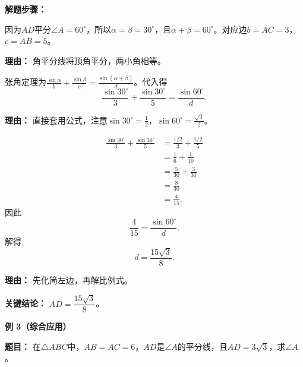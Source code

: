 \begin{examplebox}
	\textbf{\textcolor{CExample}{解题步骤：}}
	\begin{description}[style=nextline, leftmargin=2.8em, labelsep=0.5em, itemsep=0.45em]
		\item[\textbf{第一步(确定角度条件):}] 因为$AD$平分$\angle A=60^\circ$，所以$\alpha=\beta=30^\circ$，且$\alpha+\beta=60^\circ$。对应边$b=AC=3$，$c=AB=5$。
			\par\textbf{理由：} 角平分线将顶角平分，两小角相等。
		\item[\textbf{第二步(代入张角定理):}] 张角定理为$\displaystyle\frac{\sin\alpha}{b}+\frac{\sin\beta}{c}=\frac{\sin(\alpha+\beta)}{d}$。代入得
			\[
				\frac{\sin30^\circ}{3}+\frac{\sin30^\circ}{5}=\frac{\sin60^\circ}{d}.
			\]
			\par\textbf{理由：} 直接套用公式，注意$\sin30^\circ=\frac12$，$\sin60^\circ=\frac{\sqrt3}{2}$。
		\item[\textbf{第三步(解方程求$d$):}]
			\[
				\begin{aligned}
					\frac{\sin30^\circ}{3}+\frac{\sin30^\circ}{5}
					&= \frac{1/2}{3}+\frac{1/2}{5} \\
					&= \frac16+\frac1{10} \\
					&= \frac{5}{30}+\frac{3}{30} \\
					&= \frac{8}{30} \\
					&= \frac{4}{15}.
			\end{aligned}
			\]
			因此
			\[
				\frac{4}{15} = \frac{\sin60^\circ}{d}.
			\]
			解得
			\[
				d = \frac{15\sqrt3}{8}.
			\]
			\par\textbf{理由：} 先化简左边，再解比例式。
	\end{description}

	\textbf{\textcolor{CExample}{关键结论：}}
	$AD=\dfrac{15\sqrt3}{8}$。

	\medskip
	\textbf{\textcolor{CExample}{例 3（综合应用）}}

	\textbf{\textcolor{CExample}{题目：}}
	在$\triangle ABC$中，$AB=AC=6$，$AD$是$\angle A$的平分线，且$AD=3\sqrt3$，求$\angle A$。


\end{examplebox}
